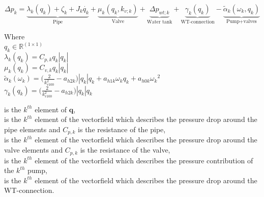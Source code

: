 
\begin{equation}
\label{CompleteModel_extended}
\Delta p_k = \underbrace{\lambda_k (q_k) + \zeta_k + J_k \dot{q_k}}_\text{Pipe} + \underbrace{\mu_k (q_k, k_{v;k})}_\text{Valve} + \underbrace{\Delta p_{wt;k}}_\text{Water tank} + \underbrace{\gamma_k (q_k)}_\text{WT-connection} - \underbrace{\tilde{\alpha}_k(\omega_k,q_k)}_\text{Pump+valves}
\end{equation}

\begin{minipage}[t]{0.20\textwidth}
Where\\
\hspace*{8mm} $q_k \in \mathbb{R}^{(1 \times 1)} $ \\
\hspace*{8mm} $\lambda_k (q_k) = C_{p,k} q_k |q_k| $ \\
\hspace*{8mm} $\mu_k (q_k) = C_{v,k} q_k |q_k| $ \\
\hspace*{8mm} $\tilde{\alpha}_k(\omega_k) = \Big(\frac{2}{k_{v100}^2} - a_{h2k}\Big)|q_k| q_k  + a_{h1k} \omega_{k} q_k + a_{h0k}{\omega_k}^2$  \\
\hspace*{8mm} $\gamma_k (q_k) = \Big(\frac{2}{k_{v100}^2} - a_{h2k}\Big)|q_k| q_k $ 
\end{minipage}
\begin{minipage}[t]{0.68\textwidth}
\vspace*{2mm}
\hspace*{4mm} is the $k^{th}$ element of $\bm{q}$, \\
\hspace*{4mm} is the $k^{th}$ element of the vectorfield which describes the pressure drop around the pipe elements and $C_{p,k}$ is the resistance of the pipe, \\
\hspace*{4mm} is the $k^{th}$ element of the vectorfield which describes the pressure drop around the valve elements and $C_{p,k}$ is the resistance of the valve, \\
\hspace*{4mm} is the $k^{th}$ element of the vectorfield which describes the pressure contribution of the $k^{th}$ pump, \\
\hspace*{4mm} is the $k^{th}$ element of the vectorfield which describes the pressure drop around the WT-connection.  
\end{minipage}

